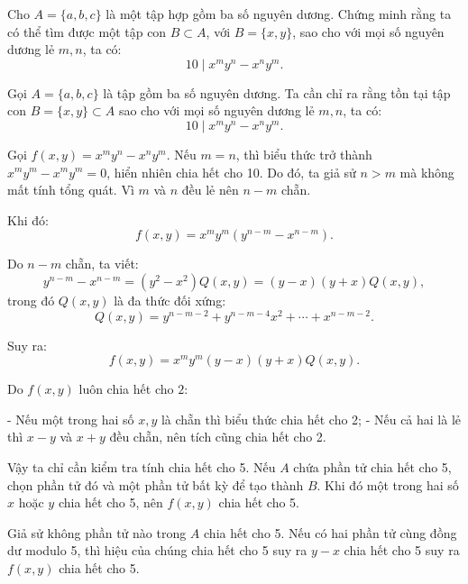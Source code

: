 \ifshowproblemandsoln
\ifshowproblem\begin{problem}\label{problem:EMC-2015-S-P1}\fi
\ifshowsoln\begin{problem}\fi
    Cho \( A = \{a, b, c\} \) là một tập hợp gồm ba số nguyên dương.  
    Chứng minh rằng ta có thể tìm được một tập con \( B \subset A \), với \( B = \{x, y\} \), sao cho với mọi số nguyên dương lẻ \( m, n \), ta có:
    \[
        10 \mid x^m y^n - x^n y^m.
    \]
\end{problem}
\fi

\ifshowsoln
\begin{soln}\footnotemark
    Gọi \( A = \{a, b, c\} \) là tập gồm ba số nguyên dương. Ta cần chỉ ra rằng tồn tại tập con \( B = \{x, y\} \subset A \)
    sao cho với mọi số nguyên dương lẻ \( m, n \), ta có:
    \[
        10 \mid x^m y^n - x^n y^m.
    \]

    Gọi \( f(x, y) = x^m y^n - x^n y^m \). Nếu \( m = n \), thì biểu thức trở thành \( x^m y^m - x^m y^m = 0 \), hiển nhiên chia hết cho 10.
    Do đó, ta giả sử \( n > m \) mà không mất tính tổng quát. Vì \( m \) và \( n \) đều lẻ nên \( n - m \) chẵn.

    Khi đó:
    \[
        f(x, y) = x^m y^m (y^{n - m} - x^{n - m}).
    \]

    Do \( n - m \) chẵn, ta viết:
    \[
        y^{n - m} - x^{n - m} = (y^2 - x^2) Q(x, y) = (y - x)(y + x) Q(x, y),
    \]
    trong đó \( Q(x, y) \) là đa thức đối xứng:
    \[
        Q(x, y) = y^{n - m - 2} + y^{n - m - 4}x^2 + \cdots + x^{n - m - 2}.
    \]

    Suy ra:
    \[
        f(x, y) = x^m y^m (y - x)(y + x) Q(x, y).
    \]

    Do \( f(x, y) \) luôn chia hết cho \( 2 \):

    - Nếu một trong hai số \( x, y \) là chẵn thì biểu thức chia hết cho 2;
    - Nếu cả hai là lẻ thì \( x - y \) và \( x + y \) đều chẵn, nên tích cũng chia hết cho 2.

    Vậy ta chỉ cần kiểm tra tính chia hết cho 5. Nếu \( A \) chứa phần tử chia hết cho 5, chọn phần tử đó và một phần tử bất kỳ để tạo thành \( B \).
    Khi đó một trong hai số \( x \) hoặc \( y \) chia hết cho 5, nên \( f(x, y) \) chia hết cho 5.

    Giả sử không phần tử nào trong \( A \) chia hết cho 5. Nếu có hai phần tử cùng đồng dư modulo 5,
    thì hiệu của chúng chia hết cho 5 suy ra \( y - x \) chia hết cho 5 suy ra \( f(x, y) \) chia hết cho 5.


\end{soln}
\end{problem}

